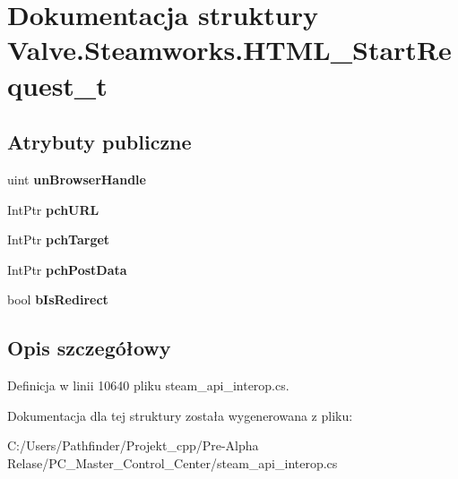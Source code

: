 \hypertarget{struct_valve_1_1_steamworks_1_1_h_t_m_l___start_request__t}{}\section{Dokumentacja struktury Valve.\+Steamworks.\+H\+T\+M\+L\+\_\+\+Start\+Request\+\_\+t}
\label{struct_valve_1_1_steamworks_1_1_h_t_m_l___start_request__t}
\subsection*{Atrybuty publiczne}
\begin{DoxyCompactItemize}
\item 
\mbox{\label{struct_valve_1_1_steamworks_1_1_h_t_m_l___start_request__t_ae65d53d74aed7bb5f65ed6f325c82653}} 
uint {\bfseries un\+Browser\+Handle}
\item 
\mbox{\label{struct_valve_1_1_steamworks_1_1_h_t_m_l___start_request__t_a30d9f23d93d35cafb7f99ca4a6aad5e1}} 
Int\+Ptr {\bfseries pch\+U\+RL}
\item 
\mbox{\label{struct_valve_1_1_steamworks_1_1_h_t_m_l___start_request__t_a53b41f38cdb58e2fffb666d41f819248}} 
Int\+Ptr {\bfseries pch\+Target}
\item 
\mbox{\label{struct_valve_1_1_steamworks_1_1_h_t_m_l___start_request__t_a30751e3b84515efb4a5395e9b21e5b0d}} 
Int\+Ptr {\bfseries pch\+Post\+Data}
\item 
\mbox{\label{struct_valve_1_1_steamworks_1_1_h_t_m_l___start_request__t_a6deb216525d7e508a323868778360597}} 
bool {\bfseries b\+Is\+Redirect}
\end{DoxyCompactItemize}


\subsection{Opis szczegółowy}


Definicja w linii 10640 pliku steam\+\_\+api\+\_\+interop.\+cs.



Dokumentacja dla tej struktury została wygenerowana z pliku\+:\begin{DoxyCompactItemize}
\item 
C\+:/\+Users/\+Pathfinder/\+Projekt\+\_\+cpp/\+Pre-\/\+Alpha Relase/\+P\+C\+\_\+\+Master\+\_\+\+Control\+\_\+\+Center/steam\+\_\+api\+\_\+interop.\+cs\end{DoxyCompactItemize}
